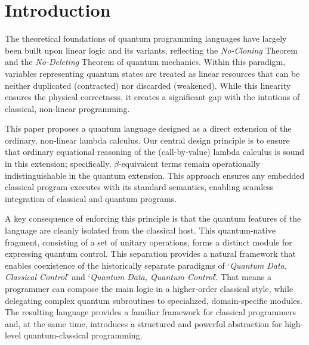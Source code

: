 \section{Introduction} \label{sec:intro}
The theoretical foundations of quantum programming languages have largely been built upon linear logic and its variants\cite{VANTONDER2004_LambdaCalculusQuantum,SELINGER2009_QuantumLambdaCalculus,ALTENKIRCH2005_FunctionalQuantumProgramming,SABRY2018_SymmetricPatternMatchingQuantum,ROSS2017_AlgebraicLogicalMethods}, reflecting the \textit{No-Cloning} Theorem\cite{WOOTTERS1982_SingleQuantumCannota} and the \textit{No-Deleting} Theorem\cite{KUMARPATI2000_ImpossibilityDeletingUnknowna} of quantum mechanics.
Within this paradigm, variables representing quantum states are treated as linear resources that can be neither duplicated (contracted) nor discarded (weakened).
While this linearity ensures the physical correctness, it creates a significant gap with the intutions of classical, non-linear programming.

This paper proposes a quantum language designed as a direct extension of the ordinary, non-linear lambda calculus.
Our central design principle is to ensure that ordinary equational reasoning of the (call-by-value) lambda calculus is sound in this extension; specifically, $\beta$-equivalent terms remain operationally indistinguishable in the quantum extension.
This approach ensures any embedded classical program executes with its standard semantics, enabling seamless integration of classical and quantum programs.

A key consequence of enforcing this principle is that the quantum features of the language are cleanly isolated from the classical host.
This quantum-native fragment, consisting of a set of unitary operations, forms a distinct module for expressing quantum control.
This separation provides a natural framework that enables coexistence of the historically separate paradigms of `\textit{Quantum Data, Classical Control}'\cite{SELINGER2004_QuantumProgrammingLanguage} and `\textit{Quantum Data, Quantum Control}'\cite{DÍAZ-CARO2022_QuickOverviewQuantum}.
That means a programmer can compose the main logic in a higher-order classical style, while delegating complex quantum subroutines to specialized, domain-specific modules.
The resulting language provides a familiar framework for classical programmers and, at the same time, introduces a structured and powerful abstraction for high-level quantum-classical programming.
